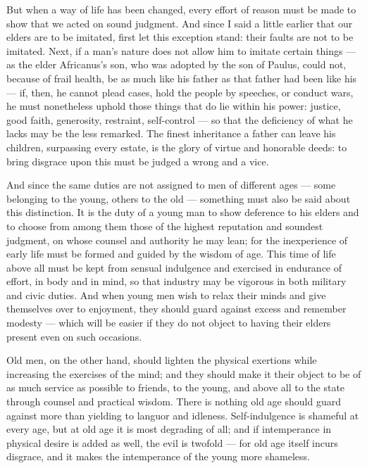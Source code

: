  But when a way of life has been changed, every effort of reason must be made to show that we acted on sound judgment. And since I said a little earlier that our elders are to be imitated, first let this exception stand: their faults are not to be imitated. Next, if a man's nature does not allow him to imitate certain things — as the elder Africanus's son, who was adopted by the son of Paulus, could not, because of frail health, be as much like his father as that father had been like his — if, then, he cannot plead cases, hold the people by speeches, or conduct wars, he must nonetheless uphold those things that do lie within his power: justice, good faith, generosity, restraint, self-control — so that the deficiency of what he lacks may be the less remarked. The finest inheritance a father can leave his children, surpassing every estate, is the glory of virtue and honorable deeds: to bring disgrace upon this must be judged a wrong and a vice.

 And since the same duties are not assigned to men of different ages — some belonging to the young, others to the old — something must also be said about this distinction. It is the duty of a young man to show deference to his elders and to choose from among them those of the highest reputation and soundest judgment, on whose counsel and authority he may lean; for the inexperience of early life must be formed and guided by the wisdom of age. This time of life above all must be kept from sensual indulgence and exercised in endurance of effort, in body and in mind, so that industry may be vigorous in both military and civic duties. And when young men wish to relax their minds and give themselves over to enjoyment, they should guard against excess and remember modesty — which will be easier if they do not object to having their elders present even on such occasions.

 Old men, on the other hand, should lighten the physical exertions while increasing the exercises of the mind; and they should make it their object to be of as much service as possible to friends, to the young, and above all to the state through counsel and practical wisdom. There is nothing old age should guard against more than yielding to languor and idleness. Self-indulgence is shameful at every age, but at old age it is most degrading of all; and if intemperance in physical desire is added as well, the evil is twofold — for old age itself incurs disgrace, and it makes the intemperance of the young more shameless.

